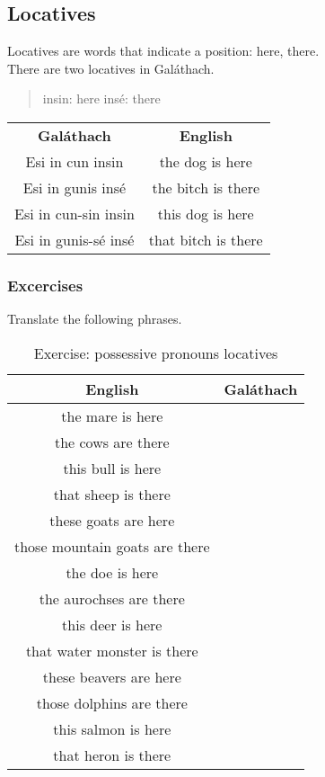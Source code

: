 \subsection{Locatives}

Locatives are words that indicate a position: here, there.\\
There are two locatives in Gal\'{a}thach.
\begin{quote}
insin: here
ins\'{e}: there
\end{quote}

\begin{table}[H]
\centering
\begin{tabular}{cc}
  \toprule
  \textbf{Gal\'{a}thach} & \textbf{English}\\
  \cmidrule(lr){1-1}\cmidrule(lr){2-2}
  Esi in cun insin & the dog is here\\
  Esi in gunis ins\'{e} & the bitch is there\\
  Esi in cun-sin insin & this dog is here\\
  Esi in gunis-s\'{e} ins\'{e} & that bitch is there\\
  \bottomrule
\end{tabular}
\label{examples_locatives}
\end{table}

\newpage
\subsubsection{Excercises}

Translate the following phrases.
\begin{table}[H]
\centering
\begin{tabular}{|c|M{5.0cm}|}
  \toprule
  \textbf{English} & \textbf{Gal\'{a}thach}\\
  \toprule
  the mare is here & \\
  \midrule
  the cows are there & \\
  \midrule
  this bull is here & \\
  \midrule
  that sheep is there & \\
  \midrule
  these goats are here & \\
  \midrule
  those mountain goats are there & \\
  \midrule
  the doe is here & \\
  \midrule
  the aurochses are there & \\
  \midrule
  this deer is here & \\
  \midrule
  that water monster is there & \\
  \midrule
  these beavers are here & \\
  \midrule
  those dolphins are there & \\
  \midrule
  this salmon is here & \\
  \midrule
  that heron is there & \\
  \bottomrule
\end{tabular}
\label{exercise_possessive_pronouns_locatives}
\caption{Exercise: possessive pronouns locatives}
\end{table}

